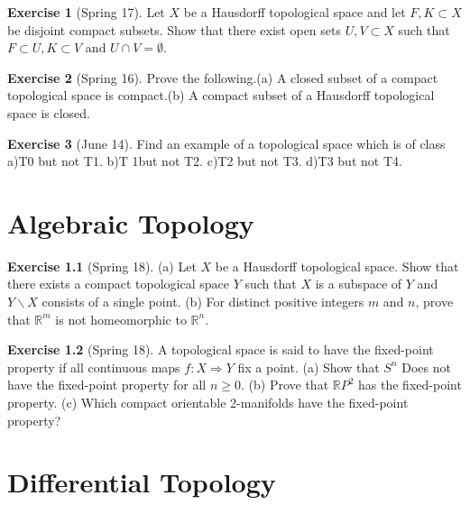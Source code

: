 \documentclass[12pt]{book}
\newcommand{\rr}{\mathbb{R}}
\theoremstyle{definition}
\newtheorem{ex}{Exercise}
\begin{document}
	\begin{ex}[Spring 17]
		Let $X$ be a Hausdorff topological space and let $F,K\subset X$ be disjoint
		 compact subsets.  Show that there exist open sets $U,V\subset X$ such
		  that $F\subset U,K\subset V$ and $U\cap V=\emptyset$.
	\end{ex}

	\begin{ex}[Spring 16]
		Prove the following.(a)  A closed subset of a compact topological space is compact.(b)  A compact subset of a Hausdorff topological space is closed.
	\end{ex}

	\begin{ex}[June 14]
		Find an example of a topological space which is of class a)T0 but not T1. b)T 1but not T2. c)T2 but not T3. d)T3 but not T4.
	\end{ex}
	\chapter{Algebraic Topology}
	
	\begin{ex}[Spring 18]
		(a) Let $X$ be a Hausdorff topological space. Show that there exists a compact topological space $Y$ such that $X$ is a subspace of $Y$ and $Y\backslash X$ consists of a single point. (b) For distinct positive integers $m$ and $n$, prove that $\rr^m$ is not homeomorphic to $\rr^n$.
	\end{ex}
	
	\begin{ex}[Spring 18]
		A topological space is said to have the fixed-point property if all continuous maps $f: X \Rightarrow Y$ fix a point. (a) Show that $S^n$ Does not have the fixed-point property for all $n\geq 0$. (b) Prove that $\rr P^2$ has the fixed-point property. (c) Which compact orientable 2-manifolds have the fixed-point property?
	\end{ex}
	\chapter{Differential Topology}
\end{document}
